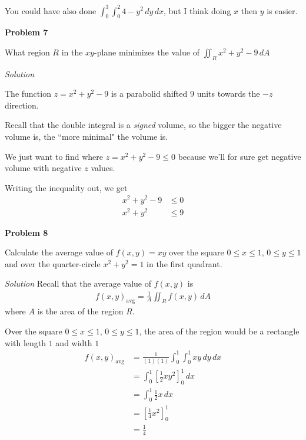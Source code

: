 \documentclass{article}
\newcommand{\lrb}[1]{\left[ #1 \right]}
\newcommand{\Solution}{\textit{Solution}}
\begin{document}
You could have also done $\displaystyle \int_0^3 \int_0^2 4-y^2 \,dy\,dx$, but I think doing $x$ then $y$ is easier.

\textbf{Problem 7}

What region $R$ in the $xy$-plane minimizes the value of $\displaystyle \iint_R x^2+y^2-9\,dA$

\Solution

The function $z=x^2+y^2-9$ is a parabolid shifted $9$ units towards the $-z$ direction. 

Recall that the double integral is a \textit{signed} volume, so the bigger the negative volume is, the ``more minimal" the volume is.

We just want to find where $z=x^2+y^2-9\leq 0$ because we'll for sure get negative volume with negative $z$ values.

Writing the inequality out, we get
\begin{align*}
    x^2+y^2-9&\leq 0\\
    x^2+y^2&\leq 9
\end{align*}

\textbf{Problem 8}

Calculate the average value of $f(x,y)=xy$ over the square $0\leq x\leq 1$, $0\leq y \leq 1$ and over the quarter-circle $x^2+y^2=1$ in the first quadrant.

\Solution
Recall that the average value of $f(x,y)$ is
\begin{align*}
    f(x,y)_{\text{avg}}=\frac{1}{A}\iint_R f(x,y)\,dA
\end{align*}
where $A$ is the area of the region $R$.

Over the square $0\leq x\leq 1$, $0\leq y \leq 1$, the area of the region would be a rectangle with length $1$ and width $1$
\begin{align*}
    f(x,y)_{\text{avg}}&=\frac{1}{(1)(1)}\int_0^1\int_0^1 xy\,dy\,dx\tag{order DOES NOT matter here}\\
    &=\int_0^1\lrb{\frac{1}{2}xy^2}_0^1\,dx\\
    &=\int_0^1 \frac{1}{2}x\,dx\\
    &=\lrb{\frac{1}{4}x^2}_0^1\\
    &=\boxed{\frac{1}{4}}
\end{align*}
\end{document}
